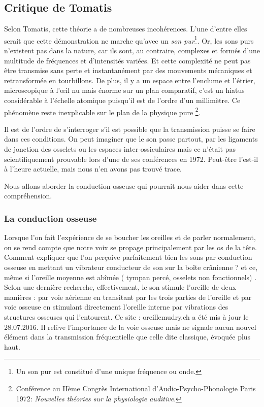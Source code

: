 \subsection{Critique de Tomatis}
 
Selon Tomatis, cette théorie a de nombreuses incohérences. L'une
d'entre elles serait que cette démonstration ne marche qu'avec un
\emph{son pur}\footnote{Un son pur est constitué d'une unique fréquence ou onde.}.
Or, les sons purs n'existent pas dans la nature, car ils sont, au
contraire, complexes et formés d'une multitude de fréquences et d'intensités
variées. Et cette complexité ne peut pas être transmise sans perte
et instantanément par des mouvements mécaniques et retransformée en
tourbillons. De plus, il y a un espace entre l'enclume et l'étrier,
microscopique à l'\oe il nu mais énorme sur un plan comparatif, c'est
un hiatus considérable à l'échelle atomique puisqu'il est de l'ordre
d'un millimètre. Ce phénomène reste inexplicable sur le plan de la
physique pure%
\footnote{Conférence au IIème Congrès International d'Audio-Psycho-Phonologie
Paris 1972:  \emph{Nouvelles théories sur la physiologie auditive}.}.
 
Il est de l'ordre de s'interroger s'il est possible que la transmission
puisse se faire dans ces conditions. On peut imaginer que le son passe
partout, par les ligaments de jonction des osselets ou les espaces
inter-ossiculaires mais %
ce n'était pas scientifiquement prouvable lors d'une de ses conférences
en 1972. Peut-être l'est-il à l'heure actuelle, mais nous n'en avons
pas trouvé trace. 

Nous allons aborder la conduction osseuse qui pourrait nous aider
dans cette compréhension.

\subsubsection{La conduction osseuse}

Lorsque l'on fait l'expérience de se
boucher les oreilles et de parler normalement, on se rend compte que
notre voix se propage principalement par les os de la tête. Comment
expliquer que l'on perçoive parfaitement bien les sons par conduction
osseuse en mettant un vibrateur conducteur de son sur la boîte crânienne
? et ce, même si l'oreille moyenne est abîmée ( tympan percé, osselets
non fonctionnels) . Selon une dernière recherche, effectivement, le
son stimule l'oreille de deux manières : par voie aérienne en transitant
par les trois parties de l'oreille et par voie osseuse en stimulant
directement l'oreille interne par vibrations des structures osseuses
qui l'entourent. Ce site : oreillemudry.ch a été mis à jour le 28.07.2016.
Il relève l'importance de la voie osseuse mais ne signale aucun nouvel
élément dans la transmission fréquentielle que celle dite classique,
évoquée plus haut.
 
